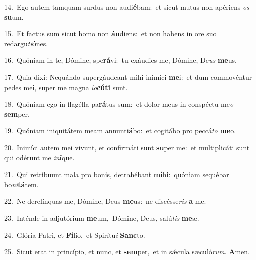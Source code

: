 {\numbfont\textcolor{\numbcolor}{14.}}~Ego autem tamquam surdus non audi\-\textbf{é}\-bam:~\star et sicut mutus non apériens \textit{os} \textbf{su}\-um.\par
{\numbfont\textcolor{\numbcolor}{15.}}~Et factus sum sicut homo non \textbf{áu}\-diens:~\star et non habens in ore suo redargu\-\textit{ti}\-\textbf{ó}nes.\par
{\numbfont\textcolor{\numbcolor}{16.}}~Quóniam in te, Dómine, spe\-\textbf{rá}\-vi:~\star tu exáudies me, Dómine, De\textit{us} \textbf{me}\-us.\par
{\numbfont\textcolor{\numbcolor}{17.}}~Quia dixi: Nequándo supergáudeant mihi inimíci \textbf{me}\-i:~\star et dum commovéntur pedes mei, super me magna \textit{lo}\-\textbf{cú}\textbf{ti} sunt.\par
{\numbfont\textcolor{\numbcolor}{18.}}~Quóniam ego in flagélla pa\-\textbf{rá}\-tus sum:~\star et dolor meus in conspéctu me\textit{o} \textbf{sem}\-per.\par
{\numbfont\textcolor{\numbcolor}{19.}}~Quóniam iniquitátem meam annunti\-\textbf{á}\-bo:~\star et cogitábo pro peccá\textit{to} \textbf{me}\-o.\par
{\numbfont\textcolor{\numbcolor}{20.}}~Inimíci autem mei vivunt, et confirmáti sunt \textbf{su}\-per me:~\star et multiplicáti sunt qui odérunt me \textit{in}\-\textbf{í}que.\par
{\numbfont\textcolor{\numbcolor}{21.}}~Qui retríbuunt mala pro bonis, detrahébant \textbf{mi}\-hi:~\star quóniam sequébar bo\-\textit{ni}\-\textbf{tá}tem.\par
{\numbfont\textcolor{\numbcolor}{22.}}~Ne derelínquas me, Dómine, Deus \textbf{me}\-us:~\star ne discésse\textit{ris} \textbf{a} me.\par
{\numbfont\textcolor{\numbcolor}{23.}}~Inténde in adjutórium \textbf{me}\-um,~\star Dómine, Deus, salú\textit{tis} \textbf{me}\-æ.\par
{\numbfont\textcolor{\numbcolor}{24.}}~Glória Patri, et \textbf{Fí}\-lio,~\star et Spirítu\textit{i} \textbf{Sanc}\-to.\par
{\numbfont\textcolor{\numbcolor}{25.}}~Sicut erat in princípio, et nunc, et \textbf{sem}\-per,~\star et in sǽcula sæculó\-\textit{rum}\-. \textbf{A}\-men.\par
